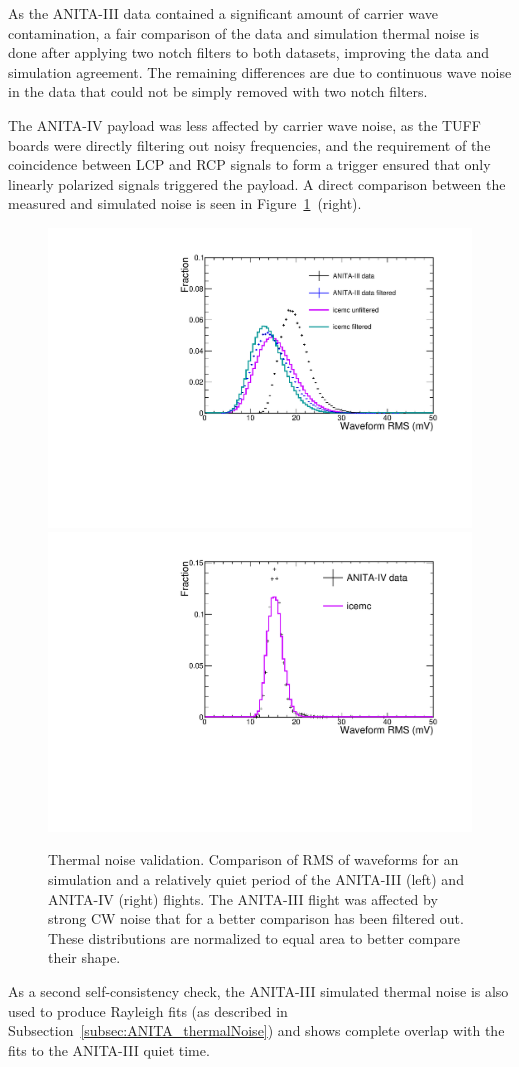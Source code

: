 As the ANITA-III data contained a significant amount of carrier wave
contamination, a fair comparison of the data and simulation thermal noise is done after applying two notch filters to both datasets, improving the data and simulation agreement.
The remaining differences are due to continuous wave noise in the data that
could not be simply removed with two notch filters.

The ANITA-IV payload was less affected by carrier wave noise, as the TUFF boards were directly filtering out noisy frequencies, and the requirement of the coincidence between LCP and RCP signals to form a trigger ensured that only linearly polarized signals triggered the payload.
A direct comparison between the measured and simulated noise is seen in Figure~\ref{fig:RMSwaveform}~(right). 

\begin{figure}[!h]\centering
  \includegraphics[width=.45\linewidth]{./Figs/ValidationThermalNoiseA3_RMSwaveform.pdf}
  \includegraphics[width=.45\linewidth]{./Figs/ValidationThermalNoiseA4_RMSwaveform.pdf}

\caption{Thermal noise validation. Comparison of RMS of waveforms for an \icemc simulation and a relatively quiet period of the ANITA-III (left) and ANITA-IV (right) flights.
    The ANITA-III flight was affected by strong CW noise that for a better comparison has been filtered out.
    These distributions are normalized to equal area to better compare their shape.
  }
  \label{fig:RMSwaveform}
\end{figure}

As a second self-consistency check, the ANITA-III simulated thermal
noise is also used to produce Rayleigh fits (as described in
Subsection~\ref{subsec:ANITA_thermalNoise}) and shows complete overlap with the fits to the
ANITA-III quiet time.


